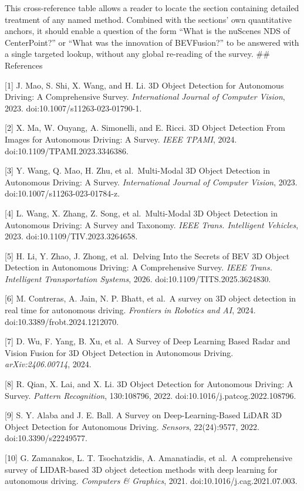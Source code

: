 This cross-reference table allows a reader to locate the section containing detailed treatment of any named method. Combined with the sections' own quantitative anchors, it should enable a question of the form ``What is the nuScenes NDS of CenterPoint?'' or ``What was the innovation of BEVFusion?'' to be answered with a single targeted lookup, without any global re-reading of the survey.
\#\# References

{[}1{]} J. Mao, S. Shi, X. Wang, and H. Li. 3D Object Detection for Autonomous Driving: A Comprehensive Survey. \emph{International Journal of Computer Vision}, 2023. doi:10.1007/s11263-023-01790-1.

{[}2{]} X. Ma, W. Ouyang, A. Simonelli, and E. Ricci. 3D Object Detection From Images for Autonomous Driving: A Survey. \emph{IEEE TPAMI}, 2024. doi:10.1109/TPAMI.2023.3346386.

{[}3{]} Y. Wang, Q. Mao, H. Zhu, et al.~Multi-Modal 3D Object Detection in Autonomous Driving: A Survey. \emph{International Journal of Computer Vision}, 2023. doi:10.1007/s11263-023-01784-z.

{[}4{]} L. Wang, X. Zhang, Z. Song, et al.~Multi-Modal 3D Object Detection in Autonomous Driving: A Survey and Taxonomy. \emph{IEEE Trans. Intelligent Vehicles}, 2023. doi:10.1109/TIV.2023.3264658.

{[}5{]} H. Li, Y. Zhao, J. Zhong, et al.~Delving Into the Secrets of BEV 3D Object Detection in Autonomous Driving: A Comprehensive Survey. \emph{IEEE Trans. Intelligent Transportation Systems}, 2026. doi:10.1109/TITS.2025.3624830.

{[}6{]} M. Contreras, A. Jain, N. P. Bhatt, et al.~A survey on 3D object detection in real time for autonomous driving. \emph{Frontiers in Robotics and AI}, 2024. doi:10.3389/frobt.2024.1212070.

{[}7{]} D. Wu, F. Yang, B. Xu, et al.~A Survey of Deep Learning Based Radar and Vision Fusion for 3D Object Detection in Autonomous Driving. \emph{arXiv:2406.00714}, 2024.

{[}8{]} R. Qian, X. Lai, and X. Li. 3D Object Detection for Autonomous Driving: A Survey. \emph{Pattern Recognition}, 130:108796, 2022. doi:10.1016/j.patcog.2022.108796.

{[}9{]} S. Y. Alaba and J. E. Ball. A Survey on Deep-Learning-Based LiDAR 3D Object Detection for Autonomous Driving. \emph{Sensors}, 22(24):9577, 2022. doi:10.3390/s22249577.

{[}10{]} G. Zamanakos, L. T. Tsochatzidis, A. Amanatiadis, et al.~A comprehensive survey of LIDAR-based 3D object detection methods with deep learning for autonomous driving. \emph{Computers \& Graphics}, 2021. doi:10.1016/j.cag.2021.07.003.

